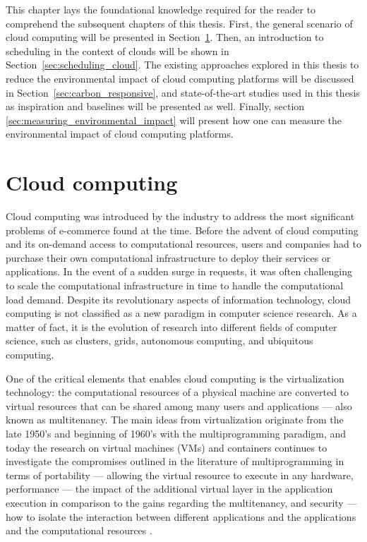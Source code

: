 This chapter lays the foundational knowledge required for the reader to comprehend the subsequent chapters of this thesis. First, the general scenario of cloud computing will be presented in Section~\ref{sec:cloud}. Then, an introduction to scheduling in the context of clouds will be shown in Section~\ref{sec:scheduling_cloud}. The existing approaches explored in this thesis to reduce the environmental impact of cloud computing platforms will be discussed in Section~\ref{sec:carbon_responsive}, and state-of-the-art studies used in this thesis as inspiration and baselines will be presented as well. Finally, section \ref{sec:measuring_environmental_impact} will present how one can measure the environmental impact of cloud computing platforms.

\section{Cloud computing}

\label{sec:cloud}

Cloud computing was introduced by the industry to address the most significant problems of e-commerce found at the time. Before the advent of cloud computing and its on-demand access to computational resources, users and companies had to purchase their own computational infrastructure to deploy their services or applications. In the event of a sudden surge in requests, it was often challenging to scale the computational infrastructure in time to handle the computational load demand. Despite its revolutionary aspects of information technology, cloud computing is not classified as a new paradigm in computer science research. As a matter of fact, it is the evolution of research into different fields of computer science, such as clusters, grids, autonomous computing, and ubiquitous computing. 

One of the critical elements that enables cloud computing is the virtualization technology: the computational resources of a physical machine are converted to virtual resources that can be shared among many users and applications --- also known as multitenancy.  The main ideas from virtualization originate from the late 1950's and beginning of 1960's with the multiprogramming paradigm, and today the research on virtual machines (VMs) and containers continues to investigate the compromises outlined in the literature of multiprogramming in terms of portability --- allowing the virtual resource to execute in any hardware,  performance --- the impact of the additional virtual layer in the application execution in comparison to the gains regarding the multitenancy, and security --- how to isolate the interaction between different applications and the applications and the computational resources \cite{randall2020_virtualization}.

